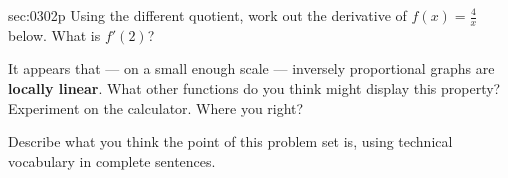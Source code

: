 \begin{multicols*}{2}
\begin{exercises}{sec:0302p}
\vspace{3cm}
\lab[] Using the different quotient, work out the derivative of $f(x)=\frac{4}{x}$ below.
What is $f'(2)$?

\vspace{3cm}
\lab[] It appears that --- on a small enough scale --- inversely proportional graphs
are \textbf{locally linear}.  What other functions do you think might display 
this property?  Experiment on the calculator.  Where you right?

\vspace{4cm}
\lab[] Describe what you think the point of this problem set is, using technical vocabulary in complete
sentences.
\end{exercises}
\end{multicols*}